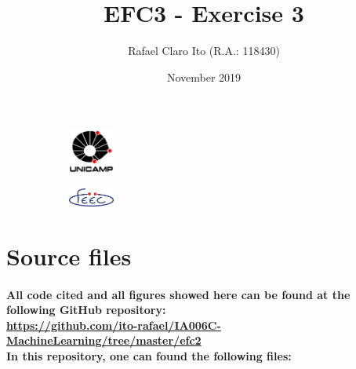 \documentclass[a4paper]{article}    %
\begin{document}
\begin{figure}
    \centering
    \begin{subfigure}{0.45\textwidth}
        \centering
        \includegraphics[width=1.5cm]{unicamp}
    \end{subfigure}
    \hfill
    \begin{subfigure}{0.45\textwidth}
        \centering
        \includegraphics[width=1.5cm]{feec}
    \end{subfigure}
\end{figure}

\title{EFC3 - Exercise 3}
\author{Rafael Claro Ito (R.A.: 118430)}
\date{November 2019}
\maketitle
\newpage

\section{Source files}

\paragraph{All code cited and all figures showed here can be found at the following GitHub repository:\\
\url{https://github.com/ito-rafael/IA006C-MachineLearning/tree/master/efc2}\\
In this repository, one can found the following files:\\}
\end{document}
